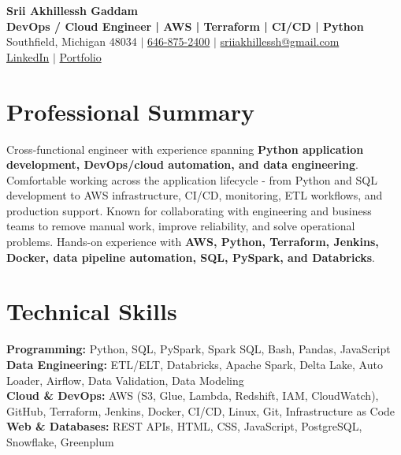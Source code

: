\documentclass[letterpaper,10pt]{article}
\begin{document}
\fontsize{9.35pt}{10.45pt}\selectfont

\begin{center}
    {\LARGE \textbf{Srii Akhillessh Gaddam}} \\[-1pt]
    \textbf{DevOps / Cloud Engineer | AWS | Terraform | CI/CD | Python} \\[2pt]
    Southfield, Michigan 48034 $|$
    \href{tel:6468752400}{646-875-2400} $|$
    \href{mailto:sriiakhillessh@gmail.com}{sriiakhillessh@gmail.com} \\[1pt]
    \href{https://www.linkedin.com/in/srii-akhiilessh-gaddam-b48668191/}{LinkedIn} $|$
    \href{https://sriiakhillesshg.github.io/portfolio/}{Portfolio}
\end{center}
\vspace{-8pt}

\section{Professional Summary}
\small{Cross-functional engineer with experience spanning \textbf{Python application development, DevOps/cloud automation, and data engineering}. Comfortable working across the application lifecycle - from Python and SQL development to AWS infrastructure, CI/CD, monitoring, ETL workflows, and production support. Known for collaborating with engineering and business teams to remove manual work, improve reliability, and solve operational problems. Hands-on experience with \textbf{AWS, Python, Terraform, Jenkins, Docker, data pipeline automation, SQL, PySpark, and Databricks}.}

\section{Technical Skills}
\small{
\textbf{Programming:} Python, SQL, PySpark, Spark SQL, Bash, Pandas, JavaScript \\
\textbf{Data Engineering:} ETL/ELT, Databricks, Apache Spark, Delta Lake, Auto Loader, Airflow, Data Validation, Data Modeling \\
\textbf{Cloud \& DevOps:} AWS (S3, Glue, Lambda, Redshift, IAM, CloudWatch), GitHub, Terraform, Jenkins, Docker, CI/CD, Linux, Git, Infrastructure as Code \\
\textbf{Web \& Databases:} REST APIs, HTML, CSS, JavaScript, PostgreSQL, Snowflake, Greenplum
}
\end{document}
